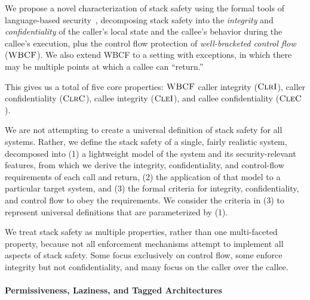 We propose a novel characterization of stack safety using the formal tools of language-based
security~\cite{sabelfeld2003language}, decomposing stack safety into
the {\em integrity} and {\em confidentiality} of the caller’s local state
and the callee's behavior during the callee's execution, plus the control flow protection
of {\em well-bracketed control flow}~\cite{SkorstengaardSTKJFP} (\(\textnormal{\sc WBCF}\)).
\ifexceptions
We also extend WBCF to a setting with exceptions,
in which there may be multiple points at which a callee can ``return.''
\fi
%

This gives us a total of five core properties: \(\textnormal{\sc WBCF}\)
caller integrity (\(\textnormal{\sc ClrI}\)), caller confidentiality (\(\textnormal{\sc ClrC}\)),
callee integrity (\(\textnormal{\sc CleI}\)), and callee confidentiality (\(\textnormal{\sc CleC}\)).

We are not attempting to create a universal definition of stack safety for all systems.
Rather, we define the stack safety of a single, fairly realistic system, decomposed into
(1) a lightweight model of the system and its security-relevant features, from which we
derive the integrity, confidentiality, and control-flow requirements of each call and
return, (2) the application of that model to a particular target system, and (3)
the formal criteria for integrity, confidentiality, and control flow
to obey the requirements. We consider the criteria in (3) to represent universal definitions
that are parameterized by (1).
%

We treat stack safety as multiple properties, rather than one multi-faceted property, because
not all enforcement mechanisms attempt to implement all aspects of stack safety. Some focus
exclusively on control flow, some enforce integrity but not confidentiality, and many
focus on the caller over the callee.
%

\paragraph*{Permissiveness, Laziness, and Tagged Architectures}

